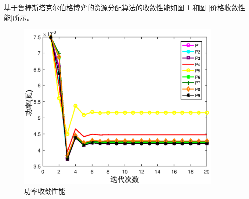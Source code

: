 基于鲁棒斯塔克尔伯格博弈的资源分配算法的收敛性能如图 \ref{功率收敛性能} 和图 \ref{价格收敛性能}所示。
\begin{figure}[H]
\centering
\includegraphics[width=10cm]{figures//chap2//功率.eps}
\caption{功率收敛性能}
\label{功率收敛性能}
\end{figure}

